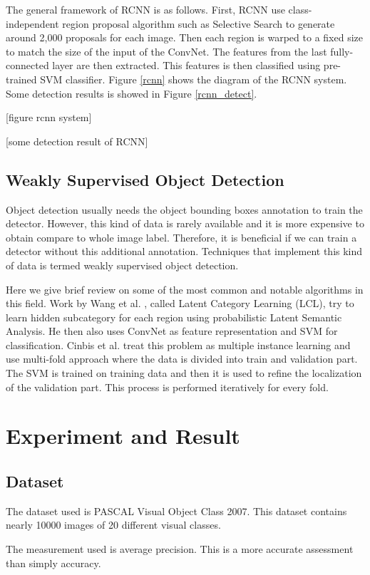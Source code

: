 \documentclass[a4paper,11pt]{kth-mag}
\begin{document}
The general framework of RCNN is as follows. First, RCNN use class-independent region proposal algorithm such as Selective Search to generate around 2,000 proposals for each image. Then each region is warped to a fixed size to match the size of the input of the ConvNet. The features from the last fully-connected layer are then extracted. This features is then classified using pre-trained SVM classifier. Figure \ref{rcnn} shows the diagram of the RCNN system. Some detection results is showed in Figure \ref{rcnn_detect}.

[figure rcnn system]

[some detection result of RCNN]

\section{Weakly Supervised Object Detection}
Object detection usually needs the object bounding boxes annotation to train the detector. However, this kind of data is rarely available and it is more expensive to obtain compare to whole image label. Therefore, it is beneficial if we can train a detector without this additional annotation. Techniques that implement this kind of data is termed weakly supervised object detection.

Here we give brief review on some of the most common and notable algorithms in this field. Work by Wang et al. \cite{wang2014lcl}, called Latent Category Learning (LCL), try to learn hidden subcategory for each region using probabilistic Latent Semantic Analysis. He then also uses ConvNet as feature representation and SVM for classification.
Cinbis et al. \cite{cinbis2014mil} treat this problem as multiple instance learning and use multi-fold approach where the data is divided into train and validation part. The SVM is trained on training data and then it is used to refine the localization of the validation part. This process is performed iteratively for every fold.

\chapter{Experiment and Result}
\section{Dataset}
The dataset used is PASCAL Visual Object Class 2007. This dataset contains nearly 10000 images of 20 different visual classes.

The measurement used is average precision. This is a more accurate assessment than simply accuracy.
\end{document}
